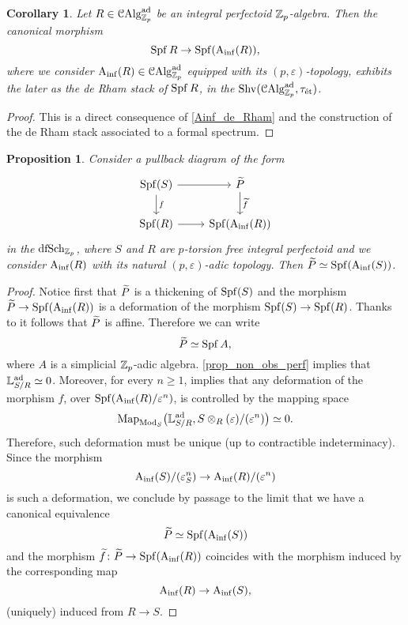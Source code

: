 \documentclass[10pt,a4paper]{amsart}
\numberwithin{equation}{subsection}
\newtheorem{corollary}[theorem]{Corollary}
\newtheorem{proposition}[theorem]{Proposition}
\theoremstyle{definition}
\begin{document}
\begin{corollary}
    Let $R \in \mathcal C \mathrm{Alg}^{\mathrm{ad}}_{\mathbb Z_p}$ be an integral perfectoid $\mathbb Z_p$-algebra. Then the canonical morphism
        \[
            \operatorname{Spf} R \to \operatorname{Spf}(\mathrm{A}_{\mathrm{inf}}(R)),
        \]
    where we consider $\mathrm{A}_{\mathrm{inf}}(R) \in \mathcal C \mathrm{Alg}^{\mathrm{ad}}_{\mathbb Z_p}$ equipped with its $(p, \varepsilon)$-topology, exhibits the later as the \emph{de Rham} stack of $\operatorname{Spf} R$, in the \infcat $\mathrm{Shv}(\mathcal C \mathrm{Alg}^{\mathrm{ad}}_{\mathbb Z_p}, \tau_{\text{\'et}})$.
\end{corollary}

\begin{proof}
    This is a direct consequence of \cref{Ainf_de_Rham} and the construction of the de Rham stack associated to a formal spectrum.
\end{proof}

\begin{proposition}
Consider a pullback diagram of the form
    \[
    \begin{tikzcd}
            \Spf(S) \ar{r} \ar{d}{f} & \tP \ar{d}{\widetilde{f}} \\
            \Spf(R) \ar{r} & \Spf (\Ainf(R))
    \end{tikzcd}
    \]
in the \infcat $\mathrm{dfSch}_{\mathbb Z_p}$, where $S$ and $R$ are $p$-torsion free integral perfectoid and we consider $\mathrm{A}_{\mathrm{inf}}(R)$ with its natural $(p, \varepsilon)$-adic topology. Then $\widetilde{P} \simeq \operatorname{Spf} (\mathrm{A}_{\mathrm{inf}}(S))$. 
\end{proposition}

\begin{proof} Notice first that $\widetilde{P}$ is a thickening of $\operatorname{Spf}(S)$ and the morphism $\widetilde{P} \to \operatorname{Spf}(\mathrm{A}_{\mathrm{inf}}(R))$ is a deformation of the morphism $\operatorname{Spf}(S) \to \operatorname{Spf}(R)$.
    Thanks to \cite[\href{https://stacks.math.columbia.edu/tag/06AD}{Tag 06AD}]{stacks-project} it follows that $\widetilde{P}$ is affine. Therefore we can write
        \[
            \widetilde{P} \simeq \operatorname{Spf} A,
        \]
    where $A$ is a simplicial $\mathbb Z_p$-adic algebra. \cref{prop_non_obs_perf} implies that $\mathbb{L}^{\mathrm{ad}}_{S/ R} \simeq 0$. Moreover, for every $n \geq 1$, \cite[Theorem 8.4.2.7]{Lurie_Higher_algebra} implies that any deformation of the morphism $f$, over $\operatorname{Spf}(\mathrm{A}_{\mathrm{inf}}(R)/\varepsilon^n)$, is controlled by the mapping space
        \[
                \mathrm{Map}_{\mathrm{Mod}_S} \big(\mathbb{L}^{\mathrm{ad}}_{S/R}, S \otimes_R ( \varepsilon)/(\varepsilon^n) \big) \simeq 0.
        \]  
    Therefore, such deformation must be unique (up to contractible indeterminacy). Since the morphism
        \[
            \mathrm{A}_{\mathrm{inf}}(S)/(\varepsilon_S^n) \to \mathrm{A}_{\mathrm{inf}}(R)/(\varepsilon^n)
        \]
    is such a deformation, we conclude by passage to the limit that we have a canonical equivalence
        \[
                \widetilde{P} \simeq \operatorname{Spf}(\mathrm{A}_{\mathrm{inf}}(S))  
        \]
    and the morphism $\widetilde{f} \colon \widetilde{P} \to \operatorname{Spf}(\mathrm{A}_{\mathrm{inf}}(R))$ coincides with the morphism induced by the corresponding map
        \[
                \mathrm{A}_{\mathrm{inf}}(R) \to \mathrm{A}_{\mathrm{inf}}(S),
        \]
    (uniquely) induced from $R \to S$.
\end{proof}
\end{document}

